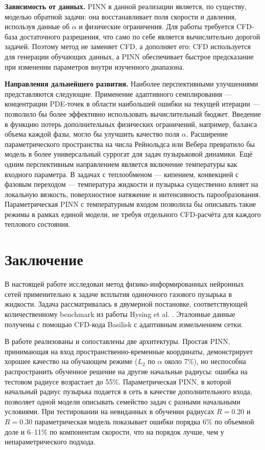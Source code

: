 \documentclass[12pt,a4paper]{article}
\begin{document}
\textbf{Зависимость от данных.} PINN в данной реализации является, по существу,
моделью обратной задачи: она восстанавливает поля скорости и давления, используя
данные об \(\alpha\) и физические ограничения. Для работы требуется CFD-база
достаточного разрешения, что само по себе является вычислительно дорогой задачей.
Поэтому метод не заменяет CFD, а дополняет его: CFD используется для генерации
обучающих данных, а PINN обеспечивает быстрое предсказание при изменении
параметров внутри изученного диапазона.

\textbf{Направления дальнейшего развития.} Наиболее перспективными улучшениями
представляются следующие. Применение адаптивного семплирования --- концентрации
PDE-точек в области наибольшей ошибки на текущей итерации --- позволило бы
более эффективно использовать вычислительный бюджет. Введение в функцию потерь
дополнительных физических ограничений, например, баланса объема каждой фазы,
могло бы улучшить качество поля \(\alpha\). Расширение параметрического пространства на числа Рейнольдса или Вебера
превратило бы модель в более универсальный суррогат для задач пузырьковой
динамики. Ещё одним перспективным направлением является включение температуры
как входного параметра. В задачах с теплообменом --- кипением, конвекцией с
фазовым переходом --- температура жидкости и пузырька существенно влияет на
локальную вязкость, поверхностное натяжение и интенсивность парообразования.
Параметрическая PINN с температурным входом позволила бы описывать такие
режимы в рамках единой модели, не требуя отдельного CFD-расчёта для каждого
теплового состояния.

\section{Заключение}

В настоящей работе исследован метод физико-информированных нейронных сетей
применительно к задаче всплытия одиночного газового пузырька в жидкости. Задача
рассматривалась в двумерной постановке, соответствующей количественному
benchmark из работы Hysing et al. \cite{Hysing2009}. Эталонные данные получены
с помощью CFD-кода Basilisk с адаптивным измельчением сетки.

В работе реализованы и сопоставлены две архитектуры. Простая PINN, принимающая
на вход пространственно-временные координаты, демонстрирует хорошее качество
на обучающем режиме (\(L_2\) по \(\alpha\) около 7\%), но неспособна
распространить обученное решение на другие начальные радиусы: ошибка на
тестовом радиусе возрастает до 55\%. Параметрическая PINN, в которой начальный
радиус пузырька подается в сеть в качестве дополнительного входа, позволяет
одной модели описывать семейство задач с разными начальными условиями. При
тестировании на невиданных в обучении радиусах \(R=0.20\) и \(R=0.30\)
параметрическая модель показывает ошибки порядка 6\% по объемной доле и 6--11\%
по компонентам скорости, что на порядок лучше, чем у непараметрического подхода.
\end{document}
